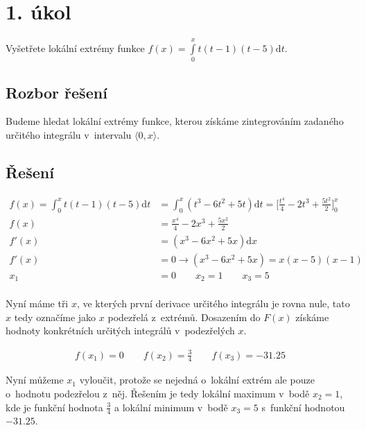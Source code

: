 \section{1. úkol}
Vyšetřete lokální extrémy funkce $f(x) = \int\limits_0^x t(t-1)(t-5)\mathrm{d}t$.

\subsection*{Rozbor řešení}
Budeme hledat lokální extrémy funkce, kterou získáme zintegrováním zadaného určitého integrálu v~intervalu $\langle 0, x \rangle$.

\subsection*{Řešení}
\begin{align*}
	f(x) = \int_0^x t(t-1)(t-5)\mathrm{d}t & = \int_0^x (t^3 - 6t^2 + 5t)\mathrm{d}t = \Big[\frac{t^4}{4} - 2t^3 + \frac{5t^2}{2}\Big]_0^x \\
	f(x) & = \frac{x^4}{4} - 2x^3 + \frac{5x^2}{2} \\
	f'(x) & = (x^3 - 6x^2 + 5x)\mathrm{d}x \\
	f'(x) & = 0  \rightarrow (x^3 - 6x^2 + 5x) = x(x - 5)(x - 1) \\
	x_1 & = 0 \qquad x_2 = 1\qquad x_3 = 5 \\
\end{align*}

Nyní máme tři $x$, ve kterých první derivace určitého integrálu je rovna nule, tato $x$ tedy označíme jako $x$ podezřelá z~extrémů. Dosazením do $F(x)$ získáme hodnoty konkrétních určitých integrálů v~podezřelých $x$.

\begin{align*}
	f(x_1) = 0 \qquad f(x_2) = \frac{3}{4} \qquad f(x_3) = -31.25
\end{align*}

Nyní můžeme $x_1$ vyloučit, protože se nejedná o~lokální extrém ale pouze o~hodnotu podezřelou z~něj. Řešením je tedy lokální maximum v~bodě $x_2 = 1$, kde je funkční hodnota $\frac{3}{4}$ a lokální minimum v~bodě $x_3 = 5$ s~funkční hodnotou $-31.25$.